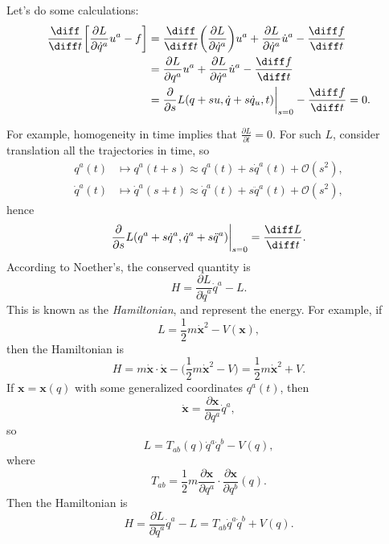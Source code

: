 \documentclass[12pt]{article}
\begin{document}
\begin{proofbox}
	Let's do some calculations:
	\begin{align*}
		\frac{\diff}{\diff t} \biggl[ \frac{\partial L}{\partial \dot q^a} u^a - f \biggr] &= \frac{\diff}{\diff t} \biggl( \frac{\partial L}{\partial \dot q^a} \biggr) u^a + \frac{\partial L}{\partial \dot q^a} \dot u^a - \frac{\diff f}{\diff t} \\
		&= \frac{\partial L}{\partial q^a} u^a + \frac{\partial L}{\partial \dot q^a} \dot u^a - \frac{\diff f}{\diff t} \\
		&= \frac{\partial}{\partial s} L(q+su, \dot q + s \dot q_u, t) \biggr|_{s=0} - \frac{\diff f}{\diff t} = 0.
	\end{align*}
\end{proofbox}

For example, homogeneity in time implies that $\frac{\partial L}{\partial t} = 0$. For such $L$, consider translation all the trajectories in time, so
\begin{align*}
	q^a(t) &\mapsto q^a(t+s) \approx q^a(t) + s \dot q^a(t) + \mathcal{O}(s^2),\\
	\dot q^a(t) &\mapsto \dot q^a(s+t) \approx \dot q^a(t) + s \ddot q^a(t) + \mathcal{O}(s^2),
\end{align*}
hence
\[
\frac{\partial}{\partial s}L(q^a + s \dot q^a, \dot q^a + s \ddot q^a) \biggr|_{s=0} = \frac{\diff L}{\diff t}.
\]
According to Noether's, the conserved quantity is
\[
H = \frac{\partial L}{\partial \dot q^a} \dot q^a - L.
\]
This is known as the \emph{Hamiltonian}, and represent the energy. For example, if
\[
L = \frac{1}{2} m \mathbf{\dot x}^2 - V(\mathbf{x}),
\]
then the Hamiltonian is
\[
H = m \mathbf{\dot x} \cdot \mathbf{\dot x} - \biggl( \frac{1}{2} m \mathbf{\dot x}^2 - V \biggr) = \frac{1}{2} m \mathbf{\dot x}^2 + V.
\]
If $\mathbf{x} = \mathbf{x}(q)$ with some generalized coordinates $q^a(t)$, then
\[
\mathbf{\dot x} = \frac{\partial \mathbf{x}}{\partial q^a} \dot q^a,
\]
so
\[
L = T_{ab}(q) \dot q^a \dot q^b - V(q),
\]
where
\[
T_{ab} = \frac{1}{2} m \frac{\partial \mathbf{x}}{\partial q^a} \cdot \frac{\partial \mathbf{x}}{\partial q^b} (q).
\]
Then the Hamiltonian is
\[
H = \frac{\partial L}{\partial \dot q^a} \dot q^a - L = T_{ab} \dot q^a \dot q^b + V(q).
\]
\end{document}
